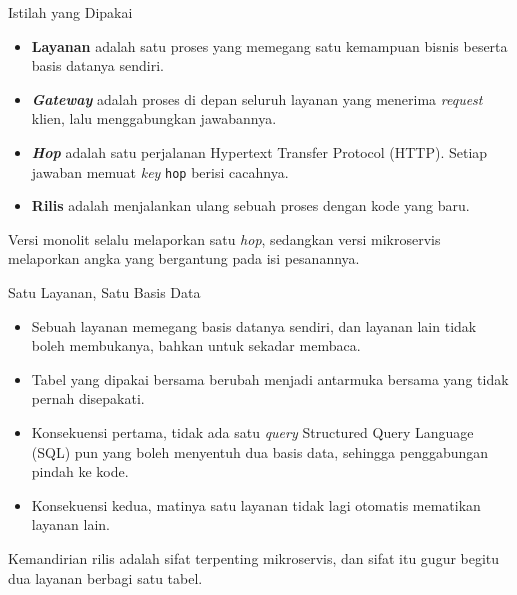 \documentclass[aspectratio=169, table, 12pt]{beamer}
\begin{document}
\begin{frame}{{\Large Istilah yang Dipakai}}
  \vspace{10pt}
  \begin{itemize}\small
    \item \textbf{Layanan} adalah satu proses yang memegang satu kemampuan
          bisnis beserta basis datanya sendiri.
    \item \textbf{\textit{Gateway}} adalah proses di depan seluruh layanan yang
          menerima \textit{request} klien, lalu menggabungkan jawabannya.
    \item \textbf{\textit{Hop}} adalah satu perjalanan Hypertext Transfer
          Protocol (HTTP). Setiap jawaban memuat \textit{key} \texttt{hop}
          berisi cacahnya.
    \item \textbf{Rilis} adalah menjalankan ulang sebuah proses dengan kode
          yang baru.
  \end{itemize}

  \vspace{10pt}
  {\small Versi monolit selalu melaporkan satu \textit{hop}, sedangkan versi
  mikroservis melaporkan angka yang bergantung pada isi pesanannya.}
\end{frame}

\begin{frame}{{\Large Satu Layanan, Satu Basis Data}}
  \vspace{10pt}
  \begin{itemize}\small
    \item Sebuah layanan memegang basis datanya sendiri, dan layanan lain
          tidak boleh membukanya, bahkan untuk sekadar membaca.
    \item Tabel yang dipakai bersama berubah menjadi antarmuka bersama yang
          tidak pernah disepakati.
    \item Konsekuensi pertama, tidak ada satu \textit{query} Structured Query
          Language (SQL) pun yang boleh menyentuh dua basis data, sehingga
          penggabungan pindah ke kode.
    \item Konsekuensi kedua, matinya satu layanan tidak lagi otomatis
          mematikan layanan lain.
  \end{itemize}

  \vspace{8pt}
  {\small Kemandirian rilis adalah sifat terpenting mikroservis, dan sifat itu
  gugur begitu dua layanan berbagi satu tabel.}
\end{frame}
\end{document}
